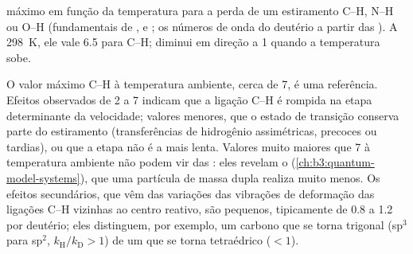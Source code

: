 \begin{omfigure}

{\small {} máximo em função da temperatura para a
perda de um estiramento C--H, N--H ou O--H (fundamentais de ,  e ;
os números de onda do deutério a partir das ). A \qty{298}{K}, ele
vale 6.5 para C--H; diminui em direção a 1 quando a temperatura sobe.}
\end{omfigure}

O valor máximo C--H à temperatura ambiente, cerca de 7, é uma referência. Efeitos
observados de 2 a 7 indicam que a ligação C--H é rompida na etapa determinante da
velocidade; valores menores, que o estado de transição conserva parte do
estiramento (transferências de hidrogênio assimétricas, precoces ou tardias), ou
que a etapa não é a mais lenta. Valores muito maiores que 7 à temperatura
ambiente não podem vir das : eles revelam o 
(\cref{ch:b3:quantum-model-systems}), que uma partícula de massa dupla realiza
muito menos. Os efeitos secundários, que vêm das variações das vibrações de
deformação das ligações C--H vizinhas ao centro reativo, são pequenos,
tipicamente de 0.8 a 1.2 por deutério; eles distinguem, por exemplo, um carbono
que se torna trigonal (sp$^3$ para sp$^2$, $k_{\mathrm H}/k_{\mathrm D} > 1$) de um que se torna
tetraédrico ($< 1$).

